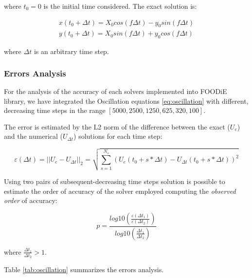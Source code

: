 \documentclass[pdftex,preprint,3p,times,numbers]{elsarticle}
\begin{document}
where $t_0=0$ is the initial time considered. The exact solution is:

\begin{equation}
\begin{matrix}
  x(t_0 + \Delta t) = X_0 cos(f \Delta t) - y_0 sin(f \Delta t) \\
  y(t_0 + \Delta t) = X_0 sin(f \Delta t) + y_0 cos(f \Delta t)
\end{matrix}
\label{eq:oscillation-exact}
\end{equation}

where $\Delta t$ is an arbitrary time step.

\subsubsection{Errors Analysis}

For the analysis of the accuracy of each solvers implemented into FOODiE library, we have integrated the Oscillation equations \ref{eq:oscillation} with different, decreasing time steps in the range $[5000, 2500, 1250, 625, 320, 100]$.

The error is estimated by the L2 norm of the difference between the exact ($U_e$) and the numerical ($U_{\Delta t}$) solutions for each time step:

\begin{equation}
  \varepsilon (\Delta t) = || U_e - U_{\Delta t} ||_2 = \sqrt{ \sum_{s=1}^{N_s} { \left(U_e(t_0 + s * \Delta t) - U_{\Delta t}(t_0 + s * \Delta t) \right)^2 }}
\label{eq:oscillation-error}
\end{equation}

Using two pairs of subsequent-decreasing time steps solution is possible to estimate the order of accuracy of the solver employed computing the \emph{observed order} of accuracy:

\begin{equation}
  p = \frac{log10 \left( \frac{\varepsilon (\Delta t_1)}{\varepsilon (\Delta t_2)} \right)}{log10 \left( \frac{\Delta t_1}{\Delta t_2} \right)}
\label{eq:oscillation-observed-order}
\end{equation}

where $\frac{\Delta t_1}{\Delta t_2}>1$.

Table \ref{tab:oscillation} summarizes the errors analysis.
\end{document}
